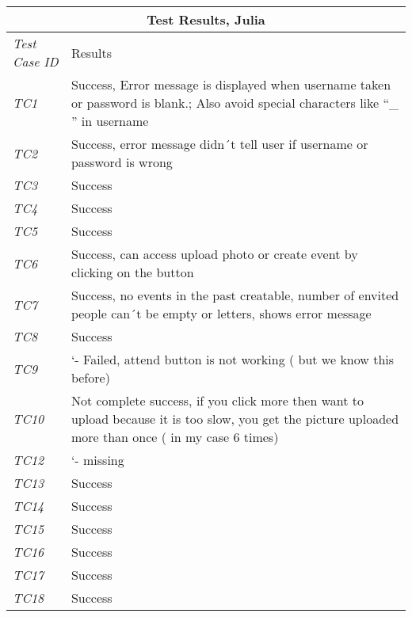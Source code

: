 \begin{minipage}{\linewidth}
\setlength{\tabcolsep}{15pt}
\centering
{}
\begin{tabular}{ |l|p{70mm}| }
	\hline
	\multicolumn{2}{|c|}{\cellcolor{gray!25} \textbf{Test Results, Julia}} \\
	\hline
	\it{\cellcolor{gray!25}Test Case ID} & {\cellcolor{gray!25} Results } \\
	\hline
	\it{\cellcolor{gray!25}TC1} & Success, 
Error message is displayed when username taken or password is blank.; Also avoid special characters like “\_ ” in username \\ \hline
	\it{\cellcolor{gray!25}TC2} & Success, error message didn´t tell user if username or password is wrong \\ \hline
	\it{\cellcolor{gray!25}TC3} & Success \\ \hline
	\it{\cellcolor{gray!25}TC4} & Success \\ \hline
	\it{\cellcolor{gray!25}TC5} & Success \\ \hline
	\it{\cellcolor{gray!25}TC6} & Success, can access upload photo or create event by clicking on the button \\ \hline
	\it{\cellcolor{gray!25}TC7} & Success, no events in the past creatable, number of envited people can´t be empty or letters, shows error message \\ \hline
	\it{\cellcolor{gray!25}TC8} & Success \\ \hline
	\it{\cellcolor{gray!25}TC9} & ‘- Failed, attend button is not working ( but we know this before) \\ \hline
	\it{\cellcolor{gray!25}TC10} & Not complete success, if you click more then want to upload because it is too slow, you get the picture uploaded more than once ( in my case 6 times) \\ \hline
	\it{\cellcolor{gray!25}TC12} & ‘- missing \\ \hline
	\it{\cellcolor{gray!25}TC13} & Success \\ \hline
	\it{\cellcolor{gray!25}TC14} & Success \\ \hline
	\it{\cellcolor{gray!25}TC15} & Success \\ \hline
	\it{\cellcolor{gray!25}TC16} & Success \\ \hline
	\it{\cellcolor{gray!25}TC17} & Success \\ \hline
	\it{\cellcolor{gray!25}TC18} & Success \\ \hline
	\hline
\end{tabular}
\medskip
\end{minipage}
